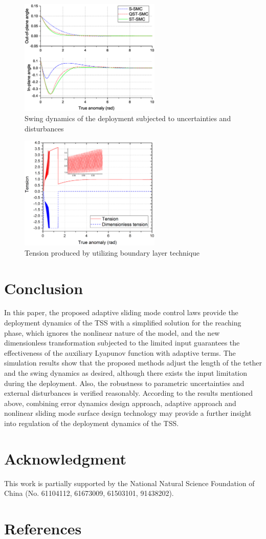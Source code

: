 \documentclass[3p]{elsarticle}
\theoremstyle{plain}
\theoremstyle{remark}
\begin{document}
\begin{figure}
\centering
\includegraphics[width=0.6\textwidth]{paper4_fig9_20161025.eps}
\caption{Swing dynamics of the deployment subjected to uncertainties and disturbances}
\label{fig:9}
\end{figure}
\begin{figure}
\centering
\includegraphics[width=0.6\textwidth]{paper4_fig10_20161025.eps}
\caption{Tension produced by utilizing boundary layer technique}
\label{fig:10}
\end{figure}
\section{Conclusion}\label{sec:5}
In this paper, the proposed adaptive sliding mode control laws provide the deployment dynamics of the TSS with a simplified solution for the reaching phase, which ignores the nonlinear nature of the model, and the new dimensionless transformation subjected to the limited input guarantees the effectiveness of the auxiliary Lyapunov function with adaptive terms. The simulation results show that the proposed methods adjust the length of the tether and the swing dynamics as desired, although there exists the input limitation during the deployment. Also, the robustness to parametric uncertainties and external disturbances is verified reasonably. According to the results mentioned above, combining error dynamics design approach, adaptive approach and nonlinear sliding mode surface design technology may provide a further insight into regulation of the deployment dynamics of the TSS.
\section{Acknowledgment}
This work is partially supported by the National Natural Science Foundation of China (No. 61104112, 61673009, 61503101, 91438202).
\section{References}


\end{document}
